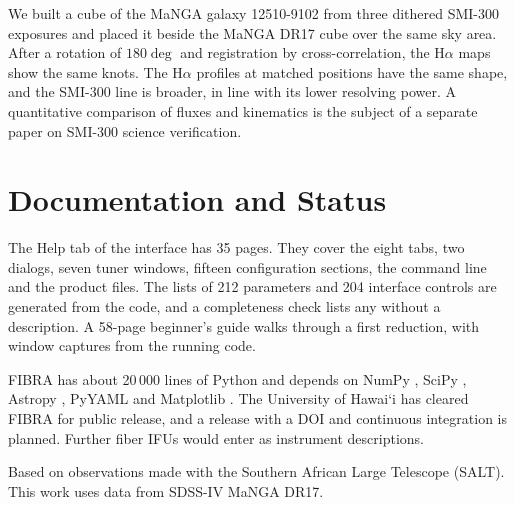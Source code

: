 \documentclass[11pt,twoside]{article}
\begin{document}
We built a cube of the MaNGA galaxy 12510-9102 from three dithered SMI-300 exposures and placed it beside the MaNGA DR17 cube \citep{2022ApJS..259...35A} over the same sky area. After a rotation of $180\deg$ and registration by cross-correlation, the H$\alpha$ maps show the same knots. The H$\alpha$ profiles at matched positions have the same shape, and the SMI-300 line is broader, in line with its lower resolving power. A quantitative comparison of fluxes and kinematics is the subject of a separate paper on SMI-300 science verification.

\section{Documentation and Status}

The Help tab of the interface has 35 pages. They cover the eight tabs, two dialogs, seven tuner windows, fifteen configuration sections, the command line and the product files. The lists of 212 parameters and 204 interface controls are generated from the code, and a completeness check lists any without a description. A 58-page beginner's guide walks through a first reduction, with window captures from the running code.

FIBRA has about 20\,000 lines of Python and depends on NumPy \citep{2020Natur.585..357H}, SciPy \citep{2020NatMe..17..261V}, Astropy \citep{2022ApJ...935..167A}, PyYAML and Matplotlib \citep{2007CSE.....9...90H}. The University of Hawai`i has cleared FIBRA for public release, and a release with a DOI and continuous integration is planned. Further fiber IFUs would enter as instrument descriptions.

\acknowledgements Based on observations made with the Southern African Large Telescope (SALT). This work uses data from SDSS-IV MaNGA DR17.



\end{document}
